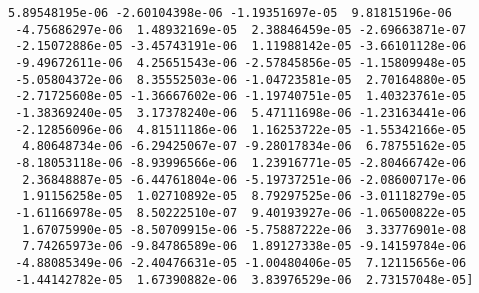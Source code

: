 \documentclass[11pt]{article}
\begin{document}
\begin{Verbatim}[commandchars=\\\{\}]
  5.89548195e-06 -2.60104398e-06 -1.19351697e-05  9.81815196e-06
 -4.75686297e-06  1.48932169e-05  2.38846459e-05 -2.69663871e-07
 -2.15072886e-05 -3.45743191e-06  1.11988142e-05 -3.66101128e-06
 -9.49672611e-06  4.25651543e-06 -2.57845856e-05 -1.15809948e-05
 -5.05804372e-06  8.35552503e-06 -1.04723581e-05  2.70164880e-05
 -2.71725608e-05 -1.36667602e-06 -1.19740751e-05  1.40323761e-05
 -1.38369240e-05  3.17378240e-06  5.47111698e-06 -1.23163441e-06
 -2.12856096e-06  4.81511186e-06  1.16253722e-05 -1.55342166e-05
  4.80648734e-06 -6.29425067e-07 -9.28017834e-06  6.78755162e-05
 -8.18053118e-06 -8.93996566e-06  1.23916771e-05 -2.80466742e-06
  2.36848887e-05 -6.44761804e-06 -5.19737251e-06 -2.08600717e-06
  1.91156258e-05  1.02710892e-05  8.79297525e-06 -3.01118279e-05
 -1.61166978e-05  8.50222510e-07  9.40193927e-06 -1.06500822e-05
  1.67075990e-05 -8.50709915e-06 -5.75887222e-06  3.33776901e-08
  7.74265973e-06 -9.84786589e-06  1.89127338e-05 -9.14159784e-06
 -4.88085349e-06 -2.40476631e-05 -1.00480406e-05  7.12115656e-06
 -1.44142782e-05  1.67390882e-06  3.83976529e-06  2.73157048e-05]

    \end{Verbatim}
\end{document}
